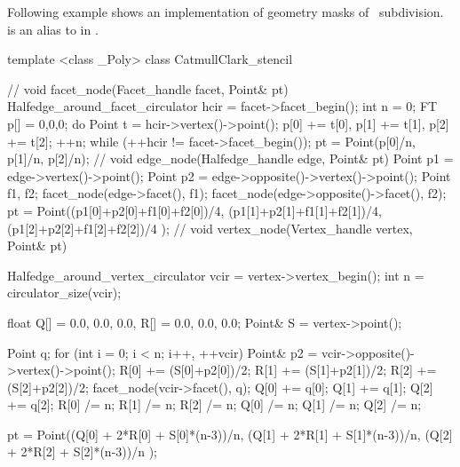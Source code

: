 
Following example shows an implementation of geometry masks 
of \CC\ subdivision.  is an alias to 
in .

\begin{ccExampleCode}
template <class _Poly>
class CatmullClark_stencil {
  //
  void facet_node(Facet_handle facet, Point& pt) {
    Halfedge_around_facet_circulator hcir = facet->facet_begin();
    int n = 0;
    FT p[] = {0,0,0};
    do {
      Point t = hcir->vertex()->point();
      p[0] += t[0], p[1] += t[1], p[2] += t[2]; 
      ++n;
    } while (++hcir != facet->facet_begin());
    pt = Point(p[0]/n, p[1]/n, p[2]/n);
  }
  //
  void edge_node(Halfedge_handle edge, Point& pt) {
    Point p1 = edge->vertex()->point();
    Point p2 = edge->opposite()->vertex()->point();
    Point f1, f2;
    facet_node(edge->facet(), f1);
    facet_node(edge->opposite()->facet(), f2);
    pt = Point((p1[0]+p2[0]+f1[0]+f2[0])/4,
               (p1[1]+p2[1]+f1[1]+f2[1])/4,
               (p1[2]+p2[2]+f1[2]+f2[2])/4 );
  }
  //
  void vertex_node(Vertex_handle vertex, Point& pt) {
    Halfedge_around_vertex_circulator vcir = vertex->vertex_begin();
    int n = circulator_size(vcir);    

    float Q[] = {0.0, 0.0, 0.0}, R[] = {0.0, 0.0, 0.0};
    Point& S = vertex->point();
    
    Point q;
    for (int i = 0; i < n; i++, ++vcir) {
      Point& p2 = vcir->opposite()->vertex()->point();
      R[0] += (S[0]+p2[0])/2;
      R[1] += (S[1]+p2[1])/2;
      R[2] += (S[2]+p2[2])/2;
      facet_node(vcir->facet(), q);
      Q[0] += q[0];      
      Q[1] += q[1];      
      Q[2] += q[2];
    }
    R[0] /= n;    R[1] /= n;    R[2] /= n;
    Q[0] /= n;    Q[1] /= n;    Q[2] /= n;
      
    pt = Point((Q[0] + 2*R[0] + S[0]*(n-3))/n,
               (Q[1] + 2*R[1] + S[1]*(n-3))/n,
               (Q[2] + 2*R[2] + S[2]*(n-3))/n );
  }
}
\end{ccExampleCode}

